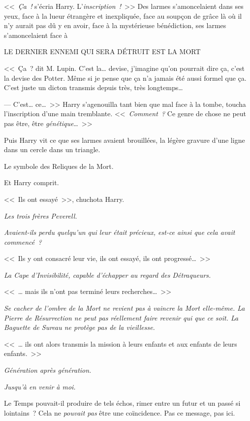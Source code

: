 <<~\emph{Ça~!} s'écria Harry. L'\emph{inscription~!}~>> Des larmes s'amoncelaient dans ses yeux, face à la lueur étrangère et inexpliquée, face au soupçon de grâce là où il n'y aurait pas dû y en avoir, face à la mystérieuse bénédiction, ses larmes s'amoncelaient face à
\begin{center}
LE DERNIER ENNEMI QUI SERA DÉTRUIT EST LA MORT
\end{center}

<<~Ça~? dit M. Lupin. C'est la… devise, j'imagine qu'on pourrait dire ça, c'est la devise des Potter. Même si je pense que ça n'a jamais été aussi formel que ça. C'est juste un dicton transmis depuis très, très longtemps…

--- C'est… ce…~>> Harry s'agenouilla tant bien que mal face à la tombe, toucha l'inscription d'une main tremblante. <<~\emph{Comment~?} Ce genre de chose ne peut pas être, être \emph{génétique}…~>>

Puis Harry vit ce que ses larmes avaient brouillées, la légère gravure d'une ligne dans un cercle dans un triangle.

Le symbole des Reliques de la Mort.

Et Harry comprit.

<<~Ils ont essayé~>>, chuchota Harry.

\emph{Les trois frères Peverell.}

\emph{Avaient-ils perdu quelqu'un qui leur était précieux, est-ce ainsi que cela avait commencé~?}

<<~Ils y ont consacré leur vie, ils ont essayé, ils ont progressé…~>>

\emph{La Cape d'Invisibilité, capable d'échapper au regard des Détraqueurs.}

<<~… mais ils n'ont pas terminé leurs recherches…~>>

\emph{Se cacher de l'ombre de la Mort ne revient pas à vaincre la Mort elle-même. La Pierre de Résurrection ne peut pas réellement faire revenir qui que ce soit. La Baguette de Sureau ne protège pas de la vieillesse.}

<<~… ils ont alors transmis la mission à leurs enfants et aux enfants de leurs enfants.~>>

\emph{Génération après génération.}

\emph{Jusqu'à en venir à moi.}

Le Temps pouvait-il produire de tels échos, rimer entre un futur et un passé si lointains~? Cela ne \emph{pouvait pas} être une coïncidence. Pas ce message, pas ici.

